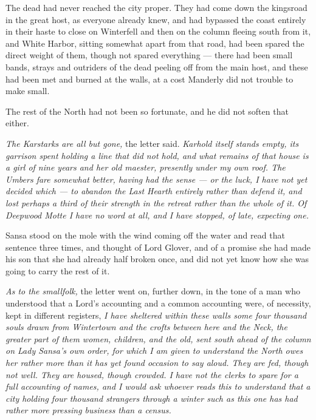 The dead had never reached the city proper. They had come down the kingsroad in the great host, as everyone already knew, and had bypassed the coast entirely in their haste to close on Winterfell and then on the column fleeing south from it, and White Harbor, sitting somewhat apart from that road, had been spared the direct weight of them, though not spared everything — there had been small bands, strays and outriders of the dead peeling off from the main host, and these had been met and burned at the walls, at a cost Manderly did not trouble to make small.

The rest of the North had not been so fortunate, and he did not soften that either.

\textit{The Karstarks are all but gone,} the letter said. \textit{Karhold itself stands empty, its garrison spent holding a line that did not hold, and what remains of that house is a girl of nine years and her old maester, presently under my own roof. The Umbers fare somewhat better, having had the sense — or the luck, I have not yet decided which — to abandon the Last Hearth entirely rather than defend it, and lost perhaps a third of their strength in the retreat rather than the whole of it. Of Deepwood Motte I have no word at all, and I have stopped, of late, expecting one.}

Sansa stood on the mole with the wind coming off the water and read that sentence three times, and thought of Lord Glover, and of a promise she had made his son that she had already half broken once, and did not yet know how she was going to carry the rest of it.

\sceneBreak

\textit{As to the smallfolk,} the letter went on, further down, in the tone of a man who understood that a Lord’s accounting and a common accounting were, of necessity, kept in different registers, \textit{I have sheltered within these walls some four thousand souls drawn from Wintertown and the crofts between here and the Neck, the greater part of them women, children, and the old, sent south ahead of the column on Lady Sansa’s own order, for which I am given to understand the North owes her rather more than it has yet found occasion to say aloud. They are fed, though not well. They are housed, though crowded. I have not the clerks to spare for a full accounting of names, and I would ask whoever reads this to understand that a city holding four thousand strangers through a winter such as this one has had rather more pressing business than a census.}

